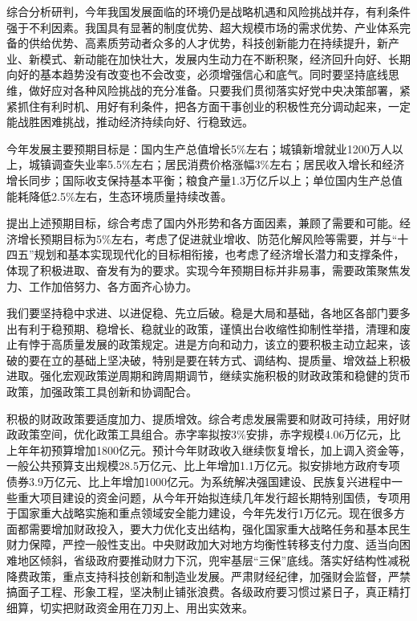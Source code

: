 \documentclass[10pt, UTF8]{ctexbook} %
\begin{document}
综合分析研判，今年我国发展面临的环境仍是战略机遇和风险挑战并存，有利条件强于不利因素。我国具有显著的制度优势、超大规模市场的需求优势、产业体系完备的供给优势、高素质劳动者众多的人才优势，科技创新能力在持续提升，新产业、新模式、新动能在加快壮大，发展内生动力在不断积聚，经济回升向好、长期向好的基本趋势没有改变也不会改变，必须增强信心和底气。同时要坚持底线思维，做好应对各种风险挑战的充分准备。只要我们贯彻落实好党中央决策部署，紧紧抓住有利时机、用好有利条件，把各方面干事创业的积极性充分调动起来，一定能战胜困难挑战，推动经济持续向好、行稳致远。

今年发展主要预期目标是：国内生产总值增长5\%左右；城镇新增就业1200万人以上，城镇调查失业率5.5\%左右；居民消费价格涨幅3\%左右；居民收入增长和经济增长同步；国际收支保持基本平衡；粮食产量1.3万亿斤以上；单位国内生产总值能耗降低2.5\%左右，生态环境质量持续改善。

提出上述预期目标，综合考虑了国内外形势和各方面因素，兼顾了需要和可能。经济增长预期目标为5\%左右，考虑了促进就业增收、防范化解风险等需要，并与“十四五”规划和基本实现现代化的目标相衔接，也考虑了经济增长潜力和支撑条件，体现了积极进取、奋发有为的要求。实现今年预期目标并非易事，需要政策聚焦发力、工作加倍努力、各方面齐心协力。

我们要坚持稳中求进、以进促稳、先立后破。稳是大局和基础，各地区各部门要多出有利于稳预期、稳增长、稳就业的政策，谨慎出台收缩性抑制性举措，清理和废止有悖于高质量发展的政策规定。进是方向和动力，该立的要积极主动立起来，该破的要在立的基础上坚决破，特别是要在转方式、调结构、提质量、增效益上积极进取。强化宏观政策逆周期和跨周期调节，继续实施积极的财政政策和稳健的货币政策，加强政策工具创新和协调配合。

积极的财政政策要适度加力、提质增效。综合考虑发展需要和财政可持续，用好财政政策空间，优化政策工具组合。赤字率拟按3\%安排，赤字规模4.06万亿元，比上年年初预算增加1800亿元。预计今年财政收入继续恢复增长，加上调入资金等，一般公共预算支出规模28.5万亿元、比上年增加1.1万亿元。拟安排地方政府专项债券3.9万亿元、比上年增加1000亿元。为系统解决强国建设、民族复兴进程中一些重大项目建设的资金问题，从今年开始拟连续几年发行超长期特别国债，专项用于国家重大战略实施和重点领域安全能力建设，今年先发行1万亿元。现在很多方面都需要增加财政投入，要大力优化支出结构，强化国家重大战略任务和基本民生财力保障，严控一般性支出。中央财政加大对地方均衡性转移支付力度、适当向困难地区倾斜，省级政府要推动财力下沉，兜牢基层“三保”底线。落实好结构性减税降费政策，重点支持科技创新和制造业发展。严肃财经纪律，加强财会监督，严禁搞面子工程、形象工程，坚决制止铺张浪费。各级政府要习惯过紧日子，真正精打细算，切实把财政资金用在刀刃上、用出实效来。
\end{document}
